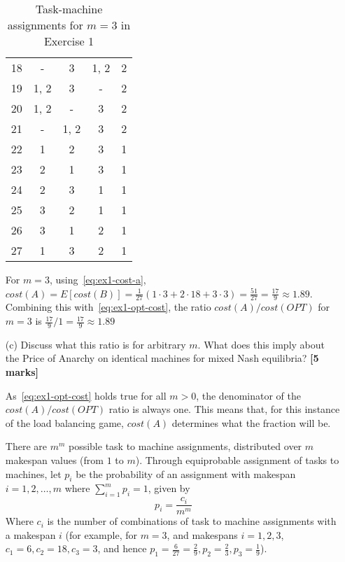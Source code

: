 \begin{enumerate}
\begin{table}[ht!]
\begin{tabular}{ccccc}
        18 & -       & 3       & 1, 2    & 2        \\
        19 & 1, 2    & 3       & -       & 2        \\
        20 & 1, 2    & -       & 3       & 2        \\
        21 & -       & 1, 2    & 3       & 2        \\
        22 & 1       & 2       & 3       & 1        \\
        23 & 2       & 1       & 3       & 1        \\
        24 & 2       & 3       & 1       & 1        \\
        25 & 3       & 2       & 1       & 1        \\
        26 & 3       & 1       & 2       & 1        \\
        27 & 1       & 3       & 2       & 1
        \end{tabular}
        \caption{Task-machine assignments for $m = 3$ in Exercise 1}
        \label{tab:ex1b}
    \end{table}

    For $m = 3$, using~\eqref{eq:ex1-cost-a}, $cost(A) = E[cost(B)] = \frac{1}{27} (1 \cdot 3 + 2 \cdot 18 + 3 \cdot 3) = \frac{51}{27} = \frac{17}{9} \approx 1.89$.
    Combining this with~\eqref{eq:ex1-opt-cost}, the ratio $cost(A)/cost(OPT)$ for $m = 3$ is $\frac{17}{9} / 1 = \frac{17}{9} \approx 1.89$

    \item[(c)] Discuss what this ratio is for arbitrary $m$. What does this imply about the Price of Anarchy on identical machines for mixed Nash equilibria?  \hfill{\bf [5 marks]}\smallskip

    As~\eqref{eq:ex1-opt-cost} holds true for all $m > 0$, the denominator of the $cost(A)/cost(OPT)$ ratio is always one.
    This means that, for this instance of the load balancing game, $cost(A)$ determines what the fraction will be.

    There are $m^m$ possible task to machine assignments, distributed over $m$ makespan values (from $1$ to $m$).
    Through equiprobable assignment of tasks to machines, let $p_i$ be the probability of an assignment with makespan $i = 1, 2, \ldots, m$ where $\sum_{i = 1}^{m}{p_i} = 1$, given by 
    \[
        p_i = \frac{c_i}{m^m}
    \]
    Where $c_i$ is the number of combinations of task to machine assignments with a makespan $i$ (for example, for $m = 3$, and makespans $i = 1, 2, 3$, $c_1 = 6, c_2 = 18, c_3 = 3$, and hence $p_1 = \frac{6}{27} = \frac{2}{9}, p_2 = \frac{2}{3}, p_3 = \frac{1}{9}$).


\end{enumerate}
